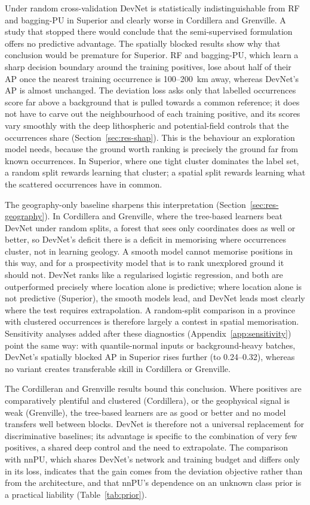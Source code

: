 \documentclass[pdflatex,sn-apa]{sn-jnl}
\begin{document}
Under random cross-validation DevNet is statistically indistinguishable from RF and bagging-PU in Superior and clearly worse in Cordillera and Grenville. A study that stopped there would conclude that the semi-supervised formulation offers no predictive advantage. The spatially blocked results show why that conclusion would be premature for Superior. RF and bagging-PU, which learn a sharp decision boundary around the training positives, lose about half of their AP once the nearest training occurrence is 100--200~km away, whereas DevNet's AP is almost unchanged. The deviation loss asks only that labelled occurrences score far above a background that is pulled towards a common reference; it does not have to carve out the neighbourhood of each training positive, and its scores vary smoothly with the deep lithospheric and potential-field controls that the occurrences share (Section~\ref{sec:res-shap}). This is the behaviour an exploration model needs, because the ground worth ranking is precisely the ground far from known occurrences. In Superior, where one tight cluster dominates the label set, a random split rewards learning that cluster; a spatial split rewards learning what the scattered occurrences have in common.

The geography-only baseline sharpens this interpretation (Section~\ref{sec:res-geography}). In Cordillera and Grenville, where the tree-based learners beat DevNet under random splits, a forest that sees only coordinates does as well or better, so DevNet's deficit there is a deficit in memorising where occurrences cluster, not in learning geology. A smooth model cannot memorise positions in this way, and for a prospectivity model that is to rank unexplored ground it should not. DevNet ranks like a regularised logistic regression, and both are outperformed precisely where location alone is predictive; where location alone is not predictive (Superior), the smooth models lead, and DevNet leads most clearly where the test requires extrapolation. A random-split comparison in a province with clustered occurrences is therefore largely a contest in spatial memorisation. Sensitivity analyses added after these diagnostics (Appendix~\ref{app:sensitivity}) point the same way: with quantile-normal inputs or background-heavy batches, DevNet's spatially blocked AP in Superior rises further (to 0.24--0.32), whereas no variant creates transferable skill in Cordillera or Grenville.

The Cordilleran and Grenville results bound this conclusion. Where positives are comparatively plentiful and clustered (Cordillera), or the geophysical signal is weak (Grenville), the tree-based learners are as good or better and no model transfers well between blocks. DevNet is therefore not a universal replacement for discriminative baselines; its advantage is specific to the combination of very few positives, a shared deep control and the need to extrapolate. The comparison with nnPU, which shares DevNet's network and training budget and differs only in its loss, indicates that the gain comes from the deviation objective rather than from the architecture, and that nnPU's dependence on an unknown class prior is a practical liability (Table~\ref{tab:prior}).
\end{document}
